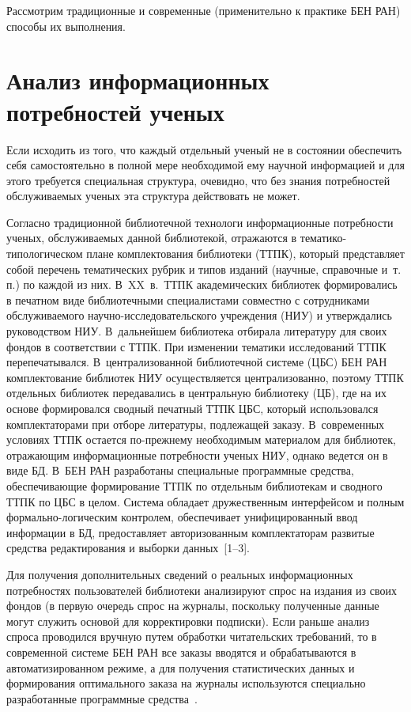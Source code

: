 \begin{multicols}{2}
Рассмотрим традиционные и 
современные (применительно к практике БЕН РАН) способы их выполнения.
   
\section{Анализ информационных потребностей ученых}
   
   Если исходить из того, что каждый отдельный ученый не в состоянии обеспечить себя 
самостоятельно в полной мере необходимой ему научной информацией и для этого 
требуется специальная структура, очевидно, что без знания потребностей обслуживаемых 
ученых эта структура действовать не может. 
   
   Согласно традиционной библиотечной технологи информационные потребности 
ученых, обслуживаемых данной библиотекой, отражаются в 
   те\-ма\-ти\-ко-ти\-по\-ло\-ги\-че\-ском плане комплектования библиотеки (ТТПК), 
который представляет собой перечень тематических рубрик и типов изданий (научные, 
справочные и~т.\,п.) по каждой из них.\linebreak
 В~XX~в.\ 
ТТПК академических библиотек формировались в печатном виде библиотечными 
специалистами совместно с сотрудниками обслуживаемого 
   на\-уч\-но-ис\-сле\-до\-ва\-тель\-ско\-го учреждения (НИУ) и утверждались 
руководством НИУ. В~дальнейшем библиотека отбирала литературу для своих фондов в 
соответствии с ТТПК. При изменении тематики исследований ТТПК перепечатывался. 
В~централизованной библиотечной системе (ЦБС) БЕН РАН комплектование биб\-лио\-тек 
НИУ осуществляется централизованно, поэтому ТТПК отдельных биб\-лио\-тек 
передавались в центральную библиотеку (ЦБ), где на их основе формировался сводный 
печатный ТТПК ЦБС, который использовался комплектаторами при отборе литературы, 
подлежащей заказу. В~современных условиях ТТПК остается по-преж\-не\-му 
необходимым материалом для библиотек, отражающим информационные потребности 
ученых НИУ, однако ведется он в виде БД. В~БЕН\linebreak
РАН разработаны 
специальные программные\linebreak
средства, обеспечивающие формирование ТТПК по отдельным 
библиотекам и сводного ТТПК по ЦБС в целом. Сис\-те\-ма обладает дружественным 
интерфейсом и полным фор\-маль\-но-ло\-ги\-че\-ским контролем, обеспечивает 
унифицированный ввод информации в БД, предоставляет авторизованным 
комплектаторам развитые средства редактирования и выборки 
   данных~[1--3]. 
   
   Для получения дополнительных сведений о реальных информационных потребностях 
пользователей библиотеки анализируют спрос на издания из своих фондов (в первую 
очередь спрос на журналы, поскольку полученные данные могут служить основой для 
корректировки подписки). Если раньше анализ спроса проводился вручную путем 
обработки читательских требований, то в современной системе БЕН РАН все заказы 
вводятся и обрабатываются в автоматизированном режиме, а для получения 
статистических данных и формирования оптимального заказа на журналы используются 
специально разработанные программные средства~\cite{7kale, 8kale}. 
   

\end{multicols}
